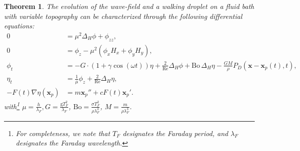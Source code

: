 \documentclass[10pt,a4paper]{amsart}
\newtheorem{theorem}{Theorem}
\newcommand{\M}[1]{\mathbf{#1}}
\begin{document}
\begin{theorem}
\label{nondim_procedure}
The evolution of the wave-field and a walking droplet on a fluid bath with variable topography can be characterized through the following differential equations:
\begin{align}
    \label{laplacian_1}
    0 &= \mu^2 \Delta_{{H}}{{\phi}} + \phi_{zz}, \\
\label{bottom_1}
    0 &= \phi_z - \mu^2({{\phi}_{{x}} {H}_{{x}} + {\phi}_{{y}} {H}_{{y}}}),\\
\label{weird_1}
    \phi_t &= - G \cdot  (1 + \gamma \cos(\omega t)) {\eta} + \frac{2}{\mathrm{Re}}  \Delta_{{H}}{{\phi}} + \mathrm{Bo} \, \Delta_{{H}}{{\eta}} - \frac{GM}{\rho} P_D({\M{{x}}} - {\M{{x}}_p(t)}, t), \\
\label{kinematical_condition_1}
    {\eta}_{{t}} &=  \frac{1} {\mu} {\phi}_{{z}} +\frac{2}{\mathrm{Re}} \Delta_H{{\eta}}, \\
\label{position_update}
    - F(t) \nabla \eta (\M{x}_p) &=  m \M{x}_p'' + c F(t) \M{x}_p'.
\end{align}
with\footnote{For completeness, we note that $T_F$ designates the Faraday period, and $\lambda_F$ designates the Faraday wavelength.} $\mu = \frac{h}{\lambda_F}, G = \frac{\text{g} T_F^2}{\lambda_F}$, $\mathrm{Bo} = \frac{\sigma T_F^2}{\rho \lambda_F^3}$, $M = \frac{m}{\rho \lambda_F^3}$.
\end{theorem}
\end{document}
